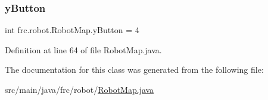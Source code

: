 \subsubsection{\texorpdfstring{y\+Button}{yButton}}
{\footnotesize\ttfamily int frc.\+robot.\+Robot\+Map.\+y\+Button = 4\hspace{0.3cm}{\ttfamily [static]}}



Definition at line 64 of file Robot\+Map.\+java.



The documentation for this class was generated from the following file\+:\begin{DoxyCompactItemize}
\item 
src/main/java/frc/robot/\hyperlink{RobotMap_8java}{Robot\+Map.\+java}\end{DoxyCompactItemize}
